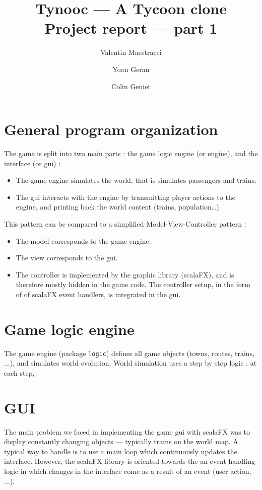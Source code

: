 \documentclass{article}
\begin{document}
\title{Tynooc --- A Tycoon clone \\ \large{Project report --- part 1}}
\author{Valentin Maestracci \and Yoan Geran \and Colin Geniet}
\maketitle

\tableofcontents

\section{General program organization}
The game is split into two main parts : the game logic engine (or engine), and the interface (or gui) :
\begin{itemize}
\item The game engine simulates the world, that is simulates passengers and trains.
\item The gui interacts with the engine by transmitting player actions to the engine, 
and printing back the world content (trains, population\dots).
\end{itemize}

This pattern can be compared to a simplified Model-View-Controller pattern :
\begin{itemize}[noitemsep]
\item The model corresponds to the game engine.
\item The view corresponds to the gui.
\item The controller is implemented by the graphic library (scalaFX), and is therefore mostly hidden in the game code.
The controller setup, in the form of of scalaFX event handlers, is integrated in the gui.
\end{itemize}



\section{Game logic engine}
The game engine (package \verb|logic|) defines all game objects (towns, routes, trains, ...), and simulates world evolution.
World simulation uses a step by step logic : at each step, 


\section{GUI}
The main problem we faced in implementing the game gui with scalaFX was to display constantly changing objects ---
typically trains on the world map. A typical way to handle is to use a main loop which continuously updates the interface.
However, the scalaFX library is oriented towards the an event handling logic
in which changes in the interface come as a result of an event (user action, ...).
\end{document}

